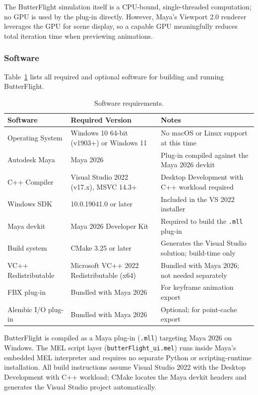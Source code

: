 \documentclass[12pt]{article}
\begin{document}
The ButterFlight simulation itself is a CPU-bound, single-threaded computation;
no GPU is used by the plug-in directly. However, Maya's Viewport 2.0 renderer
leverages the GPU for scene display, so a capable GPU meaningfully reduces total
iteration time when previewing animations.

\subsubsection{Software}

Table~\ref{tab:sw} lists all required and optional software for building and
running ButterFlight.

\begin{table}[H]
\centering
\caption{Software requirements.}
\label{tab:sw}
\begin{tabular}{|l|l|p{4.5cm}|}
\hline
\textbf{Software} & \textbf{Required Version} & \textbf{Notes} \\
\hline
Operating System &
  Windows 10 64-bit (v1903+) or Windows 11 &
  No macOS or Linux support at this time \\
\hline
Autodesk Maya &
  Maya 2026 &
  Plug-in compiled against the Maya 2026 devkit \\
\hline
C++ Compiler &
  Visual Studio 2022 (v17.x), MSVC 14.3+ &
  Desktop Development with C++ workload required \\
\hline
Windows SDK &
  10.0.19041.0 or later &
  Included in the VS 2022 installer \\
\hline
Maya devkit &
  Maya 2026 Developer Kit &
  Required to build the \texttt{.mll} plug-in \\
\hline
Build system &
  CMake 3.25 or later &
  Generates the Visual Studio solution; build-time only \\
\hline
VC++ Redistributable &
  Microsoft VC++ 2022 Redistributable (x64) &
  Bundled with Maya 2026; not needed separately \\
\hline
FBX plug-in &
  Bundled with Maya 2026 &
  For keyframe animation export \\
\hline
Alembic I/O plug-in &
  Bundled with Maya 2026 &
  Optional; for point-cache export \\
\hline
\end{tabular}
\end{table}

ButterFlight is compiled as a Maya plug-in (\texttt{.mll}) targeting Maya 2026
on Windows. The MEL script layer (\texttt{butterFlight\_ui.mel}) runs inside
Maya's embedded MEL interpreter and requires no separate Python or scripting-runtime
installation. All build instructions assume Visual Studio 2022 with the Desktop
Development with C++ workload; CMake locates the Maya devkit headers and generates
the Visual Studio project automatically.
\end{document}
